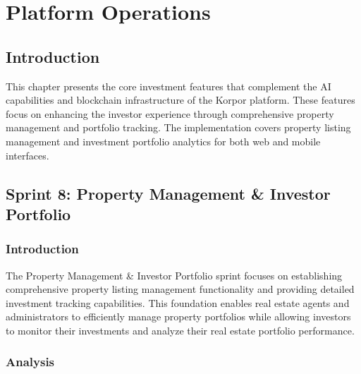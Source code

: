 \chapter{Platform Operations}


\section*{Introduction}

This chapter presents the core investment features that complement the AI capabilities and blockchain infrastructure of the Korpor platform. These features focus on enhancing the investor experience through comprehensive property management and portfolio tracking. The implementation covers property listing management and investment portfolio analytics for both web and mobile interfaces.

\section{Sprint 8: Property Management \& Investor Portfolio}

\subsection*{Introduction}
The Property Management \& Investor Portfolio sprint focuses on establishing comprehensive property listing management functionality and providing detailed investment tracking capabilities. This foundation enables real estate agents and administrators to efficiently manage property portfolios while allowing investors to monitor their investments and analyze their real estate portfolio performance.

\subsection{Analysis}
